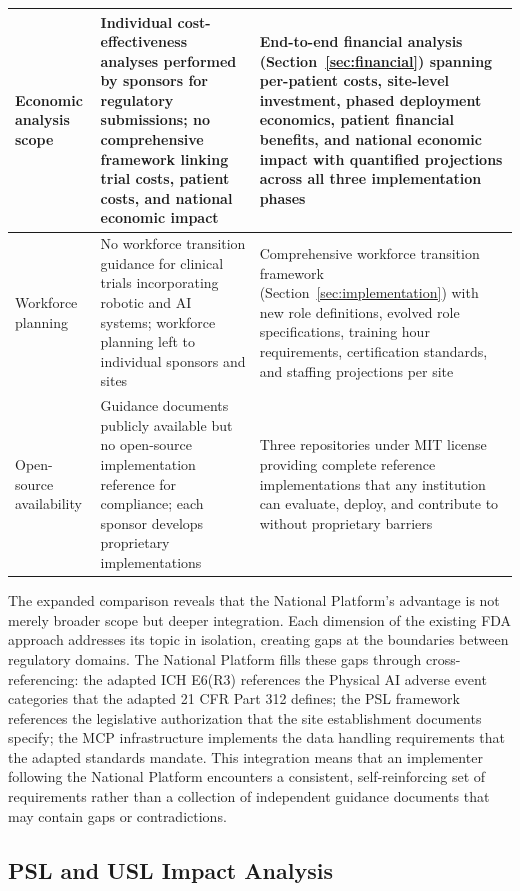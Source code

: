 \begin{longtable}{>{\raggedright\arraybackslash}p{3cm} >{\raggedright\arraybackslash}p{6cm} >{\raggedright\arraybackslash}p{7cm}}
\midrule
Economic analysis scope & Individual cost-effectiveness analyses performed by sponsors for regulatory submissions; no comprehensive framework linking trial costs, patient costs, and national economic impact & End-to-end financial analysis (Section~\ref{sec:financial}) spanning per-patient costs, site-level investment, phased deployment economics, patient financial benefits, and national economic impact with quantified projections across all three implementation phases \\
\midrule
Workforce planning & No workforce transition guidance for clinical trials incorporating robotic and AI systems; workforce planning left to individual sponsors and sites & Comprehensive workforce transition framework (Section~\ref{sec:implementation}) with new role definitions, evolved role specifications, training hour requirements, certification standards, and staffing projections per site \\
\midrule
Open-source availability & Guidance documents publicly available but no open-source implementation reference for compliance; each sponsor develops proprietary implementations & Three repositories under MIT license \cite{main-repo, mcp-repo, fl-repo} providing complete reference implementations that any institution can evaluate, deploy, and contribute to without proprietary barriers \\
\end{longtable}

The expanded comparison reveals that the National Platform's advantage is not
merely broader scope but deeper integration. Each dimension of the existing
FDA approach addresses its topic in isolation, creating gaps at the boundaries
between regulatory domains. The National Platform fills these gaps through
cross-referencing: the adapted ICH E6(R3) references the Physical AI adverse
event categories that the adapted 21 CFR Part 312 defines; the PSL framework
references the legislative authorization that the site establishment documents
specify; the MCP infrastructure implements the data handling requirements that
the adapted standards mandate. This integration means that an implementer
following the National Platform encounters a consistent, self-reinforcing set
of requirements rather than a collection of independent guidance documents
that may contain gaps or contradictions.

\subsection{PSL and USL Impact Analysis}
\label{subsec:discuss-psl-usl-impact}


